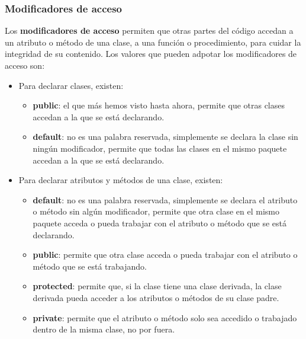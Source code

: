 \subsubsection{Modificadores de acceso}
Los \textbf{modificadores de acceso} permiten que otras partes del código accedan a un atributo o método de una clase, a una función o procedimiento, para cuidar la integridad de su contenido. Los valores que pueden adpotar los modificadores de acceso son:
\begin{itemize}
    \item Para declarar clases, existen:
        \begin{itemize}
            \item \textbf{public}: el que más hemos visto hasta ahora, permite que otras clases accedan a la que se está declarando.
            \item \textbf{default}: no es una palabra reservada, simplemente se declara la clase sin ningún modificador, permite que todas las clases en el mismo paquete accedan a la que se está declarando.
        \end{itemize}
    \item Para declarar atributos y métodos de una clase, existen:
        \begin{itemize}
            \item \textbf{default}: no es una palabra reservada, simplemente se declara el atributo o método sin algún modificador, permite que otra clase en el mismo paquete acceda o pueda trabajar con el atributo o método que se está declarando.
            \item \textbf{public}: permite que otra clase acceda o pueda trabajar con el atributo o método que se está trabajando.
            \item \textbf{protected}: permite que, si la clase tiene una clase derivada, la clase derivada pueda acceder a los atributos o métodos de su clase padre.
            \item \textbf{private}: permite que el atributo o método solo sea accedido o trabajado dentro de la misma clase, no por fuera.
        \end{itemize}
\end{itemize}

